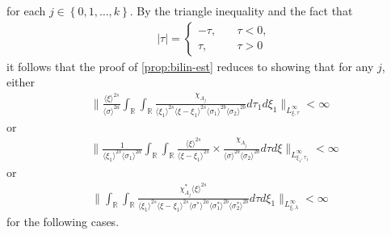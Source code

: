 \documentclass[12pt,reqno]{amsart}
\numberwithin{equation}{section}  %
\numberwithin{figure}{section}
\newcommand{\rr}{\mathbb{R}}
\theoremstyle{plain}
\theoremstyle{definition}
\theoremstyle{remark}
\begin{document}
for each $j \in \left\{ 0,1,\dots,k \right\}$. 
By the triangle inequality and the fact that 
%
%
\begin{equation*}
\begin{split}
& | \tau | =
\begin{cases}
  - \tau, \quad & \tau < 0, 
\\
\tau, \quad & \tau > 0
\end{cases}
\end{split}
\end{equation*}
%
%
it follows that the proof of \autoref{prop:bilin-est} reduces to showing that
for any $j$, either 
%
%
\begin{equation}
  \label{sup-est-gen-1}
  \begin{split}
    \| \frac{ \langle \xi
    \rangle ^{2s}}{\langle \sigma \rangle ^{2a}}
    \int_{\rr} \int_{\rr} \frac{\chi_{A_{j}}}{ \langle \xi_{1} \rangle ^{2s} \langle \xi-\xi_{1} \rangle ^{2s} 
    \langle \sigma_{1} \rangle^{2b} \langle  \sigma_{2} \rangle^{2b} }
    d \tau_1 d \xi_{1} \|_{L^{\infty}_{\xi, \tau}} < \infty
  \end{split}
\end{equation}
%
%
or 
\begin{equation}
  \label{sup-est-gen-2}
\begin{split}
  & \| \frac{1}{\langle \xi_{1} \rangle ^{2s}
  \langle \sigma_{1} \rangle
  ^{2a}} \int_{\rr} \int_{\rr} \frac{\langle \xi \rangle ^{2s}}{\langle
  \xi - \xi_{1}\rangle ^{2s}}  \times \frac{\chi_{A_{j}}}{\langle
  \sigma \rangle ^{2b} \langle \sigma_{2} \rangle ^{2b}} d \tau d \xi
  \|_{L^{\infty}_{\xi_{1}, \tau_{1}}} < \infty
\end{split}
\end{equation}
%
or
\begin{equation}
  \label{sup-est-gen-3}
\begin{split}
  \| \int_{\rr}  \int_{\rr} \frac{\chi^{*}_{A_{j}}
    \langle \xi \rangle ^{2s}
    }{ \langle \xi_{1} \rangle^{2s} \langle
    \xi-\xi_{1} \rangle ^{2s} \langle \sigma^{*}  
    \rangle ^{2a}
    \langle \sigma_{1}^{*} \rangle^{2b}
    \langle  \sigma_{2}^{*} \rangle^{2b}  } d \tau d \xi_{1}  \|_{L^{\infty}_{\xi, \lambda}}
    < \infty
\end{split}
\end{equation}
%
for the following cases.
\end{document}
